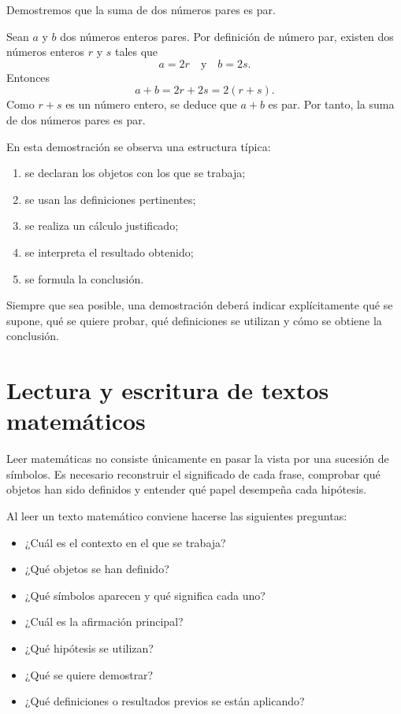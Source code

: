 \begin{ejemplo}
Demostremos que la suma de dos números pares es par.

Sean \(a\) y \(b\) dos números enteros pares. Por definición de número par, existen dos números enteros \(r\) y \(s\) tales que
\[
  a=2r
  \quad \text{y} \quad
  b=2s.
\]
Entonces
\[
  a+b = 2r+2s = 2(r+s).
\]
Como \(r+s\) es un número entero, se deduce que \(a+b\) es par. Por tanto, la suma de dos números pares es par.
\end{ejemplo}

En esta demostración se observa una estructura típica:

\begin{enumerate}
  \item se declaran los objetos con los que se trabaja;
  \item se usan las definiciones pertinentes;
  \item se realiza un cálculo justificado;
  \item se interpreta el resultado obtenido;
  \item se formula la conclusión.
\end{enumerate}

\begin{convencion}
Siempre que sea posible, una demostración deberá indicar explícitamente qué se supone, qué se quiere probar, qué definiciones se utilizan y cómo se obtiene la conclusión.
\end{convencion}

\section{Lectura y escritura de textos matemáticos}
\label{sec:lectura-escritura-textos}

Leer matemáticas no consiste únicamente en pasar la vista por una sucesión de símbolos. Es necesario reconstruir el significado de cada frase, comprobar qué objetos han sido definidos y entender qué papel desempeña cada hipótesis.

Al leer un texto matemático conviene hacerse las siguientes preguntas:

\begin{itemize}
  \item ¿Cuál es el contexto en el que se trabaja?
  \item ¿Qué objetos se han definido?
  \item ¿Qué símbolos aparecen y qué significa cada uno?
  \item ¿Cuál es la afirmación principal?
  \item ¿Qué hipótesis se utilizan?
  \item ¿Qué se quiere demostrar?
  \item ¿Qué definiciones o resultados previos se están aplicando?
\end{itemize}

